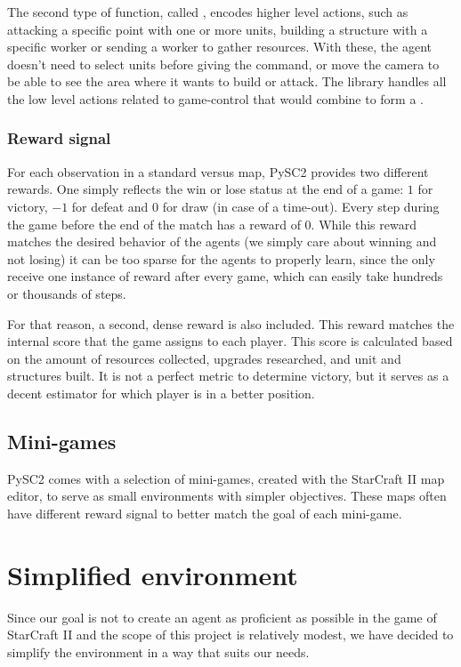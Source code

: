 The second type of function, called , encodes higher level actions, such as attacking a specific point with one or more units, building a structure with a specific worker or sending a worker to gather resources. With these, the agent doesn't need to select units before giving the command, or move the camera to be able to see the area where it wants to build or attack. The library handles all the low level  actions related to game-control that would combine to form a .

\subsubsection*{Reward signal}
\label{sec:reward_signal}

For each observation in a standard versus map, PySC2 provides two different rewards. One simply reflects the win or lose status at the end of a game: $1$ for victory, $-1$ for defeat and $0$ for draw (in case of a time-out). Every step during the game before the end of the match has a reward of $0$. While this reward matches the desired behavior of the agents (we simply care about winning and not losing) it can be too sparse for the agents to properly learn, since the only receive one instance of reward after every game, which can easily take hundreds or thousands of steps.

For that reason, a second, dense reward is also included. This reward matches the internal score that the game assigns to each player. This score is calculated based on the amount of resources collected, upgrades researched, and unit and structures built. It is not a perfect metric to determine victory, but it serves as a decent estimator for which player is in a better position.

\subsection{Mini-games}

PySC2 comes with a selection of mini-games, created with the StarCraft II map editor, to serve as small environments with simpler objectives. These maps often have different reward signal to better match the goal of each mini-game.

\section{Simplified environment}

Since our goal is not to create an agent as proficient as possible in the game of StarCraft II and the scope of this project is relatively modest, we have decided to simplify the environment in a way that suits our needs.

